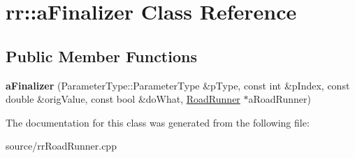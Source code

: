 \hypertarget{classrr_1_1a_finalizer}{\section{rr\-:\-:a\-Finalizer Class Reference}
\label{classrr_1_1a_finalizer}
}
\subsection*{Public Member Functions}
\begin{DoxyCompactItemize}
\item 
\hypertarget{classrr_1_1a_finalizer_a1e1fb83b63ae1456d502bae58a8fcbad}{{\bfseries a\-Finalizer} (Parameter\-Type\-::\-Parameter\-Type \&p\-Type, const int \&p\-Index, const double \&orig\-Value, const bool \&do\-What, \hyperlink{classrr_1_1_road_runner}{Road\-Runner} $\ast$a\-Road\-Runner)}\label{classrr_1_1a_finalizer_a1e1fb83b63ae1456d502bae58a8fcbad}

\end{DoxyCompactItemize}


The documentation for this class was generated from the following file\-:\begin{DoxyCompactItemize}
\item 
source/rr\-Road\-Runner.\-cpp\end{DoxyCompactItemize}
